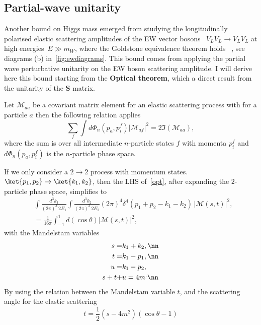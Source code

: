 \subsection{Partial-wave unitarity \label{pwusection}}
Another bound on Higgs mass emerged from studying the longitudinally polarised elastic scattering amplitudes of the EW vector bosons ~$V_L V_L \to V_L V_L$ at high energies~$ E \gg m_W$, where the Goldstone equivalence theorem holds ~\cite{PhysRevD.42.853}, see diagrams (b) in~\autoref{fig:ewdiagrams}. 
This bound comes from applying the partial wave perturbative unitarity on the EW boson scattering amplitude. I will derive here this bound starting from the \textbf{Optical theorem}, which a direct result from the unitarity of the $\mathbf S$ matrix.
\begin{tcolorbox}[title=The optical theorem,
	title filled=false,
	colback=Mahogany!5!white,
	colframe=Mahogany]
	Let $\mathcal M_{aa}$ be a covariant matrix element for an elastic  scattering process with for a particle $a$  then the following relation applies
	\begin{equation}
		\sum_{f}  \int d\Phi_n(p_a,p_i^f)| \mathcal M_{af}|^2 = 2 \mathfrak{I}( \mathcal M_{aa}),
		\label{opt}
	\end{equation}
	where the sum is over all intermediate $n$-particle states $f$ with momenta $p_i^f$ and $d\Phi_n(p_a,p_i^f)$ is the $n$-particle phase space.
\end{tcolorbox}
If we only consider a $2 \to 2$ process with momentum states. $\ket{p_1,p_2} \to \ket{k_1,k_2}$, then the LHS of~\eqref{opt}, after expanding the $2$-particle phase space, simplifies to 
\begin{align}
	&\int  \frac{d^3k_1}{(2 \pi)^3\,2E_1} \int  \frac{d^3k_2}{(2 \pi)^3\,2E_2} (2 \pi)^4 \delta^4(p_1+p_2-k_1-k_2)\,| \mathcal M (s,t)|^2 ,\nonumber \\
	&= \frac{1}{16 \pi} \int_{-1}^{1} d(\cos \theta) | \mathcal M (s,t)|^2,
\end{align}
with the Mandelstam variables 
\begin{align}
	s = &k_1+k_2, \nn \\
	t =& k_1-p_1, \nn \\
	u=& k_1-p_2, \\
	s+t+&u = 4 m^. \nn
\end{align}
By using the relation between the Mandelstam variable $t$, and the scattering angle for the elastic scattering 
\begin{equation}
	t = \frac{1}{2} (s-4 m^2)(\cos \theta-1)
\end{equation}
